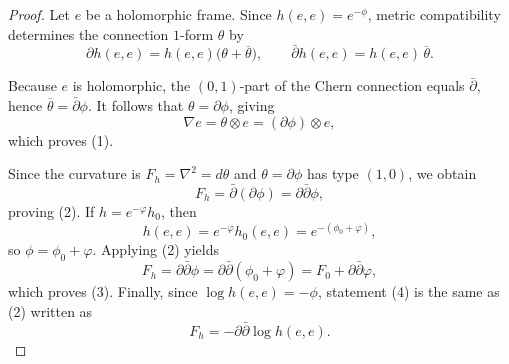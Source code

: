 \documentclass[12pt]{article}
\begin{document}
\begin{proof}
    Let $e$ be a holomorphic frame. Since $h(e,e)=e^{-\phi}$, metric compatibility determines the connection $1$-form $\theta$ by
    \[
    \partial h(e,e) = h(e,e)\bigl(\theta + \overline{\theta}\bigr),\qquad
    \bar\partial h(e,e) = h(e,e)\,\overline{\theta}.
    \]

    Because $e$ is holomorphic, the $(0,1)$-part of the Chern connection equals $\bar\partial$, hence $\overline{\theta}=\bar\partial\phi$. It follows that $\theta=\partial\phi$, giving
    \[
    \nabla e = \theta\otimes e = (\partial\phi)\otimes e,
    \]
    which proves (1).

    Since the curvature is $F_h=\nabla^2=d\theta$ and $\theta=\partial\phi$ has type $(1,0)$, we obtain
    \[
    F_h=\bar\partial(\partial\phi)=\partial\bar\partial\phi,
    \]
    proving (2). If $h=e^{-\varphi}h_0$, then
    \[
    h(e,e)=e^{-\varphi}h_0(e,e)=e^{-(\phi_0+\varphi)},
    \]
    so $\phi=\phi_0+\varphi$. Applying (2) yields
    \[F_h=\partial\bar\partial\phi=\partial\bar\partial(\phi_0+\varphi)=F_0+\partial\bar\partial\varphi,
    \]
    which proves (3). Finally, since $\log h(e,e)=-\phi$, statement (4) is the same as (2) written as
    \[
    F_h=-\partial\bar\partial\log h(e,e).
    \]
\end{proof}
\end{document}
